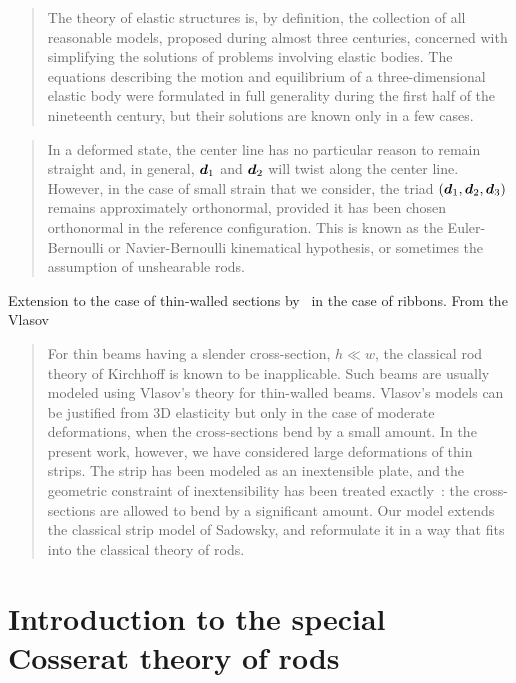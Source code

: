 \blockcquote[p.~xvii]{Villaggio1997}{The theory of elastic structures is, by definition, the collection of all reasonable models, proposed during almost three centuries, concerned with simplifying the solutions of problems involving elastic bodies. The equations describing the motion and equilibrium of a three-dimensional elastic body were formulated in full generality during the first half of the nineteenth century, but their solutions are known only in a few cases.}

\blockcquote[p.~68]{Audoly2010}{In a deformed state, the center line has no particular reason to remain straight and, in general, $\boldsymbol{d}_1$ and $\boldsymbol{d}_2$ will twist along the center line. However, in the case of small strain that we consider, the triad $(\boldsymbol{d}_1,\boldsymbol{d}_2,\boldsymbol{d}_3)$ remains approximately orthonormal, provided it has been chosen orthonormal in the reference configuration. This is known as the Euler-Bernoulli or Navier-Bernoulli kinematical hypothesis, or sometimes the assumption of unshearable rods.}

Extension to the case of thin-walled sections by~\cite{Dias2015, Vetyukov2014} in the case of ribbons. From the Vlasov

\blockcquote[p.]{Dias2014}{For thin beams having a slender cross-section, $h \ll w$, the classical rod theory of Kirchhoff is known to be inapplicable. Such beams are usually modeled using Vlasov’s theory for thin-walled beams. Vlasov’s models can be justified from 3D elasticity but only in the case of moderate deformations, when the cross-sections bend by a small amount. In the present work, however, we have considered large deformations of thin strips. The strip has been modeled as an inextensible  plate, and the geometric  constraint of inextensibility has been treated exactly~: the cross-sections are allowed to bend by a significant amount. Our model extends the classical strip model of Sadowsky, and reformulate it in a way that fits into the classical theory of rods.}

\clearpage
\section{Introduction to the special Cosserat theory of rods}

